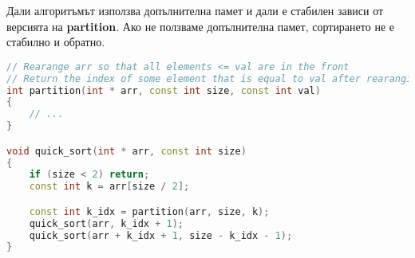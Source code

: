 \documentclass[fleqn,12pt]{article}
\begin{document}
Дали алгоритъмът използва допълнителна памет и дали е стабилен зависи от версията на \textbf{partition}. Ако не ползваме допълнителна памет,
сортирането не е стабилно и обратно.

\begin{lstlisting}[language=C++, caption=QuickSort]
// Rearange arr so that all elements <= val are in the front
// Return the index of some element that is equal to val after rearanging
int partition(int * arr, const int size, const int val)
{
    // ...
}

void quick_sort(int * arr, const int size)
{
    if (size < 2) return;
    const int k = arr[size / 2];

    const int k_idx = partition(arr, size, k);
    quick_sort(arr, k_idx + 1);
    quick_sort(arr + k_idx + 1, size - k_idx - 1);
}
\end{lstlisting}
\end{document}
